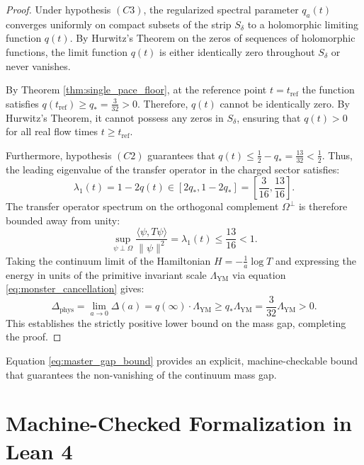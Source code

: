 \documentclass[11pt,reqno]{amsart}
\theoremstyle{plain}
\theoremstyle{definition}
\theoremstyle{remark}
\numberwithin{equation}{section}
\begin{document}
\begin{proof}
Under hypothesis $(C3)$, the regularized spectral parameter $q_a(t)$ converges uniformly on compact subsets of the strip $S_\delta$ to a holomorphic limiting function $q(t)$. By Hurwitz's Theorem on the zeros of sequences of holomorphic functions, the limit function $q(t)$ is either identically zero throughout $S_\delta$ or never vanishes.

By Theorem \ref{thm:single_pace_floor}, at the reference point $t = t_{\mathrm{ref}}$ the function satisfies $q(t_{\mathrm{ref}}) \ge q_* = \frac{3}{32} > 0$. Therefore, $q(t)$ cannot be identically zero. By Hurwitz's Theorem, it cannot possess any zeros in $S_\delta$, ensuring that $q(t) > 0$ for all real flow times $t \ge t_{\mathrm{ref}}$.

Furthermore, hypothesis $(C2)$ guarantees that $q(t) \le \frac{1}{2} - q_* = \frac{13}{32} < \frac{1}{2}$. Thus, the leading eigenvalue of the transfer operator in the charged sector satisfies:
\begin{equation}
\lambda_1(t) = 1 - 2q(t) \in \left[ 2q_*, 1 - 2q_* \right] = \left[ \frac{3}{16}, \frac{13}{16} \right].
\end{equation}
The transfer operator spectrum on the orthogonal complement $\Omega^\perp$ is therefore bounded away from unity:
\begin{equation}
\sup_{\psi \perp \Omega} \frac{\langle \psi, T \psi \rangle}{\|\psi\|^2} = \lambda_1(t) \le \frac{13}{16} < 1.
\end{equation}
Taking the continuum limit of the Hamiltonian $H = -\frac{1}{a} \log T$ and expressing the energy in units of the primitive invariant scale $\Lambda_{\mathrm{YM}}$ via equation \eqref{eq:monster_cancellation} gives:
\begin{equation}
\Delta_{\mathrm{phys}} = \lim_{a \to 0} \Delta(a) = q(\infty) \cdot \Lambda_{\mathrm{YM}} \ge q_* \Lambda_{\mathrm{YM}} = \frac{3}{32} \Lambda_{\mathrm{YM}} > 0.
\end{equation}
This establishes the strictly positive lower bound on the mass gap, completing the proof.
\end{proof}
Equation \eqref{eq:master_gap_bound} provides an explicit, machine-checkable bound that guarantees the non-vanishing of the continuum mass gap.

\section{Machine-Checked Formalization in Lean 4}
\end{document}
